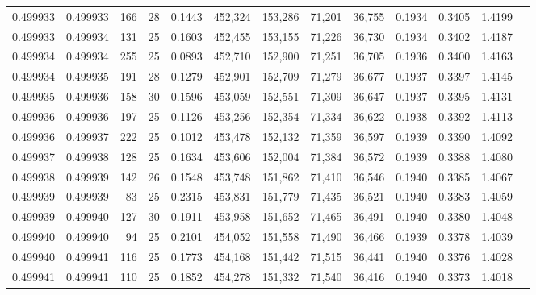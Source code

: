 \begin{tabular}{rrrrrrrrrrrrr}
0.499933 & 0.499933 & 166 &  28 &                                     0.1443 & 452,324 & 153,286 &  71,201 &  36,755 & 0.1934 & 0.3405 & 1.4199 \\
0.499933 & 0.499934 & 131 &  25 &                                     0.1603 & 452,455 & 153,155 &  71,226 &  36,730 & 0.1934 & 0.3402 & 1.4187 \\
0.499934 & 0.499934 & 255 &  25 &                                     0.0893 & 452,710 & 152,900 &  71,251 &  36,705 & 0.1936 & 0.3400 & 1.4163 \\
0.499934 & 0.499935 & 191 &  28 &                                     0.1279 & 452,901 & 152,709 &  71,279 &  36,677 & 0.1937 & 0.3397 & 1.4145 \\
0.499935 & 0.499936 & 158 &  30 &                                     0.1596 & 453,059 & 152,551 &  71,309 &  36,647 & 0.1937 & 0.3395 & 1.4131 \\
0.499936 & 0.499936 & 197 &  25 &                                     0.1126 & 453,256 & 152,354 &  71,334 &  36,622 & 0.1938 & 0.3392 & 1.4113 \\
0.499936 & 0.499937 & 222 &  25 &                                     0.1012 & 453,478 & 152,132 &  71,359 &  36,597 & 0.1939 & 0.3390 & 1.4092 \\
0.499937 & 0.499938 & 128 &  25 &                                     0.1634 & 453,606 & 152,004 &  71,384 &  36,572 & 0.1939 & 0.3388 & 1.4080 \\
0.499938 & 0.499939 & 142 &  26 &                                     0.1548 & 453,748 & 151,862 &  71,410 &  36,546 & 0.1940 & 0.3385 & 1.4067 \\
0.499939 & 0.499939 &  83 &  25 &                                     0.2315 & 453,831 & 151,779 &  71,435 &  36,521 & 0.1940 & 0.3383 & 1.4059 \\
0.499939 & 0.499940 & 127 &  30 &                                     0.1911 & 453,958 & 151,652 &  71,465 &  36,491 & 0.1940 & 0.3380 & 1.4048 \\
0.499940 & 0.499940 &  94 &  25 &                                     0.2101 & 454,052 & 151,558 &  71,490 &  36,466 & 0.1939 & 0.3378 & 1.4039 \\
0.499940 & 0.499941 & 116 &  25 &                                     0.1773 & 454,168 & 151,442 &  71,515 &  36,441 & 0.1940 & 0.3376 & 1.4028 \\
0.499941 & 0.499941 & 110 &  25 &                                     0.1852 & 454,278 & 151,332 &  71,540 &  36,416 & 0.1940 & 0.3373 & 1.4018 \\

\end{tabular}
